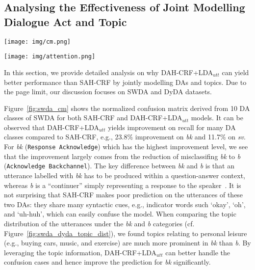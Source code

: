 \documentclass[11pt,a4paper]{article}
\begin{document}
\subsection{Analysing the Effectiveness of Joint Modelling Dialogue Act and Topic}

\begin{figure*}[tb]
    \centering
        \texttt{[image: img/cm.png]}
    \caption{The normalized confusion matrix of DAs using SAH-CRF (left) and DAH-CRF+LDA$_{utt}$ (right) on SWDA (a) and DyDA (b).}
    \label{fig:swda_cm}
\end{figure*}

\begin{figure*}[tb]
  \centering
  \texttt{[image: img/attention.png]}
  \caption{DA Attention visualisation using SAH-CRF and DAH-CRF+LDA$_{utt}$ on (a) SWDA and (b) DyDA datasets. The true labels of the utterances above are \textit{sd} (\textit{statement-non-opinion}) and \textit{Directive}, respectively. SAH-CRF misclassified the  DA as \textit{sv} (\textit{statement-opinion}) and \textit{Inform} whereas  DAH-CRF+LDA$_{utt}$ gives correct prediction for both cases.}
  \label{fig:swda_dyda_attention}
\end{figure*}

In this section, we provide detailed analysis on why DAH-CRF+LDA$_{utt}$ can yield better performance than  SAH-CRF by jointly modelling DAs and topics. Due to the page limit, our discussion focuses on SWDA and DyDA datasets.
 



Figure~\ref{fig:swda_cm} shows the normalized confusion matrix derived from 10 DA classes of SWDA for both SAH-CRF and DAH-CRF+LDA$_{utt}$ models. 
It can be observed that DAH-CRF+LDA$_{utt}$ yields improvement on recall for many DA classes compared to SAH-CRF, e.g., 23.8\% improvement on \textit{bk} and 11.7\% on \textit{sv}. For \textit{bk} (\texttt{Response Acknowledge}) which has the highest improvement level, we see that the improvement largely comes from the reduction of misclassifing \textit{bk} to \textit{b} (\texttt{Acknowledge Backchannel}). The key difference between \textit{bk} and \textit{b} is that an utterance labelled with \textit{bk} has to be produced within a question-answer context, whereas \textit{b} is a ``continuer'' simply representing a response to the speaker~\cite{jurafsky1997switchboard}.
It is not surprising that SAH-CRF makes poor prediction on the utterances of these two DAs: they share many syntactic cues, e.g., indicator words such `okay', `oh', and `uh-huh', which can easily confuse the model. When comparing the topic distribution of the utterances under the \textit{bk} and \textit{b} categories (cf. Figure~\ref{fig:swda_dyda_topic_dist}), we found topics relating to personal leisure (e.g., buying cars, music, and exercise) are much more prominent in \textit{bk} than \textit{b}. By leveraging the topic information, DAH-CRF+LDA$_{utt}$ can better handle the confusion cases and hence improve the prediction for \textit{bk} significantly.  
\end{document}
